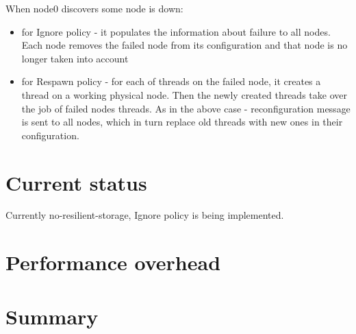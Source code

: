 \documentclass[12pt]{article}
\begin{document}
When node0 discovers some node is down:
\begin{itemize}
\item for Ignore policy - it populates the information about failure to all nodes.
Each node removes the failed node from its configuration and that node is no longer
taken into account
\item for Respawn policy - for each of threads on the failed node,
it creates a thread on a working physical node. Then the newly created threads
take over the job of failed nodes threads. As in the above case - reconfiguration message
is sent to all nodes, which in turn replace old threads with new ones in their configuration.
\end{itemize}


\section{Current status}
Currently no-resilient-storage, Ignore policy is being implemented.

\section{Performance overhead}

\section{Summary}
\end{document}
